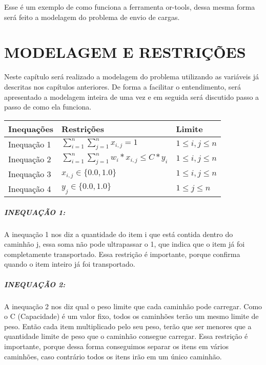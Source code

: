     Esse é um exemplo de como funciona a ferramenta or-tools, dessa mesma forma será feito a modelagem do problema de envio de cargas.
   
\chapter{MODELAGEM E RESTRIÇÕES}
  Neste capítulo será realizado a modelagem do problema utilizando as variáveis já descritas nos capítulos anteriores. De forma a facilitar o entendimento, será apresentado a modelagem inteira de uma vez e em seguida será discutido passo a passo de como ela funciona.
  \begin{center}
    \begin{tabular}{|p{3cm}|p{5cm}|p{3cm}|}
      \hline
        Inequações & Restrições & Limite \\
      \hline
        Inequação 1 & \( \sum_{i=1}^{n} \sum_{j=1}^{n} x_{i,j} = 1\) & \( 1 \leq i,j \leq n  \)\\
      \hline
        Inequação 2 & \( \sum_{i=1}^{n} \sum_{j=1}^{n} w_{i}*x_{i,j} \leq C*y_{i}\) & \( 1 \leq i,j \leq n  \)\\
      \hline
        Inequação 3 & \(  x_{i,j} \in \{0.0, 1.0\}  \) & \( 1 \leq i,j \leq n  \)\\
      \hline
        Inequação 4 & \(  y_{j} \in \{0.0, 1.0\} \) & \( 1 \leq j \leq n  \)\\
      \hline
    \end{tabular}
  \end{center}

\paragraph{INEQUAÇÃO 1:}
  A inequação 1 nos diz a quantidade do item i que está contida dentro do caminhão j, essa soma não pode ultrapassar o 1, que indica que o item já foi completamente transportado.
Essa restrição é importante, porque confirma quando o item inteiro já foi transportado.
\\

\paragraph{INEQUAÇÃO 2:}
  A inequação 2 nos diz qual o peso limite que cada caminhão pode carregar. Como o C (Capacidade) é um valor fixo, todos os caminhões terão um mesmo limite de peso. Então cada item multiplicado pelo seu peso, terão que ser menores que a quantidade limite de peso que o caminhão consegue carregar. Essa restrição é importante, porque dessa forma conseguimos separar os itens em vários caminhões, caso contrário todos os itens irão em um único caminhão.


